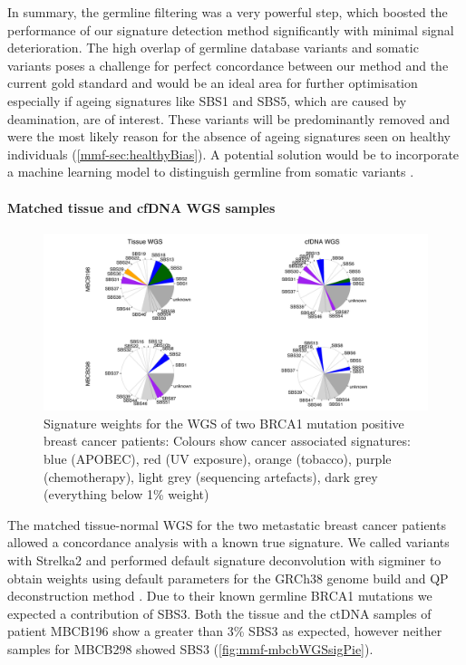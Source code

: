 In summary, the germline filtering was a very powerful step, which boosted the performance of our signature detection method significantly with minimal signal deterioration. The high overlap of germline database variants and somatic variants poses a challenge for perfect concordance between our method and the current gold standard and would be an ideal area for further optimisation especially if ageing signatures like SBS1 and SBS5, which are caused by deamination, are  of interest. These  variants will be predominantly removed and were the most likely reason for the absence of ageing signatures seen on healthy individuals (\autoref{mmf-sec:healthyBias}). A potential solution would be to incorporate a machine learning model to distinguish germline from somatic variants \cite{Spinella2016,Sahraeian2022}.

\paragraph{Matched tissue and cfDNA WGS samples}
\label{mmf-sec:matchedMBCB}

\begin{figure}[ht]
\centering
\includegraphics[width=.99\linewidth]{Figures/MisMatchFinder/mbcbWGSsignatures.pdf}
\caption[Signature weights for the WGS of two BRCA1 mutation positive breast cancer patients]{Signature weights for the WGS of two BRCA1 mutation positive breast cancer patients: Colours show cancer associated signatures: blue (APOBEC), red (UV exposure), orange (tobacco), purple (chemotherapy), light grey (sequencing artefacts), dark grey (everything below 1\% weight)}\label{fig:mmf-mbcbWGSsigPie}
\end{figure}
 
The matched tissue-normal WGS for the two metastatic breast cancer patients allowed a concordance analysis with a known true signature. We called variants with Strelka2 and performed default signature deconvolution with sigminer to obtain weights using default parameters for the GRCh38 genome build and QP deconstruction method  \cite{Wang2021}. Due to their known germline BRCA1 mutations we expected a contribution of SBS3. Both the tissue and the ctDNA samples of patient MBCB196 show a greater than 3\% SBS3 as expected, however neither samples for MBCB298 showed SBS3 (\autoref{fig:mmf-mbcbWGSsigPie}).
 
